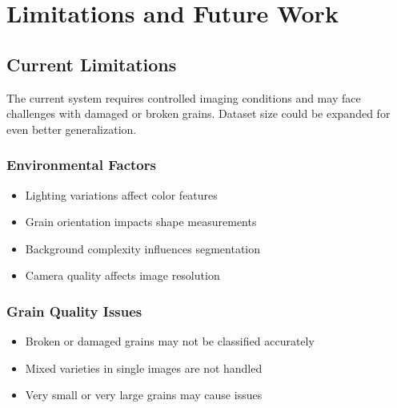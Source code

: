 \documentclass[conference]{IEEEtran}
\begin{document}
\begin{table}[H]
\caption{Comparison with Existing Studies}
\centering
\small
{}
\label{tab:comparison}
\end{table}

\section{Limitations and Future Work}

\subsection{Current Limitations}

The current system requires controlled imaging conditions and may face challenges with damaged or broken grains. Dataset size could be expanded for even better generalization.

\subsubsection{Environmental Factors}
\begin{itemize}
    \item Lighting variations affect color features
    \item Grain orientation impacts shape measurements
    \item Background complexity influences segmentation
    \item Camera quality affects image resolution
\end{itemize}

\subsubsection{Grain Quality Issues}
\begin{itemize}
    \item Broken or damaged grains may not be classified accurately
    \item Mixed varieties in single images are not handled
    \item Very small or very large grains may cause issues
\end{itemize}
\end{document}
